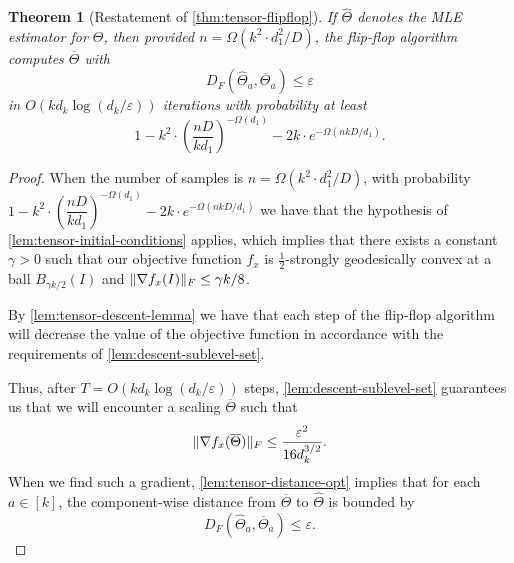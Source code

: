 \documentclass[aos]{imsart}
\newtheorem{theorem}{Theorem}[section]
\theoremstyle{definition}
\numberwithin{equation}{section}
\DeclarePairedDelimiter{\norm}{\lVert}{\rVert}
\newcommand{\otheta}{\overline{\Theta}}
\newcommand{\htheta}{\widehat{\Theta}}
\newcommand{\eps}{\varepsilon}
\begin{document}
\begin{theorem}[Restatement of \cref{thm:tensor-flipflop}]
	If $\htheta$ denotes the MLE estimator for $\Theta$, then provided $n = \Omega(k^2 \cdot d_1^2/D)$, the flip-flop algorithm computes $\otheta$ with
	$$ D_F(\htheta_a, \otheta_a) \leq \eps $$
	in $O(k d_k \log(d_k/\eps))$ iterations with probability at least
	$$ 1 - k^2 \cdot \left( \dfrac{nD}{k d_1} \right)^{-\Omega(d_1)} - 2k \cdot e^{- \Omega(nkD/d_1)}.$$
\end{theorem}

\begin{proof}
	When the number of samples is $n = \Omega(k^2 \cdot d_1^2/D)$, with probability \\
	$ 1 - k^2 \cdot \left( \dfrac{nD}{k d_1} \right)^{-\Omega(d_1)} - 2k \cdot e^{- \Omega(nkD/d_1)}$ we have that the hypothesis of \cref{lem:tensor-initial-conditions} applies, which implies that there exists a constant $\gamma > 0$ such that our objective function $f_x$ is $\frac{1}{2}$-strongly geodesically convex at a ball $B_{\gamma k/2}(I)$ and $\norm{\nabla f_x(I)}_F \leq \gamma k /8$.

	By \cref{lem:tensor-descent-lemma} we have that each step of the flip-flop algorithm will decrease the value of the objective function in accordance with the requirements of \cref{lem:descent-sublevel-set}.

	Thus, after $T = O( k d_k \log(d_k/\eps) )$ steps, \cref{lem:descent-sublevel-set} guarantees us that we will encounter a scaling $\otheta$ such that
	$$ \norm{\nabla f_x(\otheta)}_F \leq \dfrac{\eps^2}{16 d_k^{3/2}}.$$
	When we find such a gradient, \cref{lem:tensor-distance-opt} implies that for each $a \in [k]$, the component-wise distance from $\otheta$ to $\htheta$ is bounded by
	$$ D_F(\htheta_a, \otheta_a) \leq \eps. $$
\end{proof}

\end{document}
